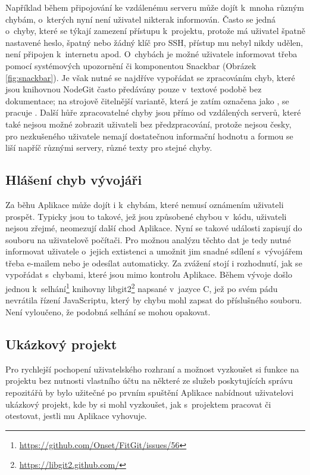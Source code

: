 Například během připojování ke vzdálenému serveru může dojít k~mnoha různým chybám, o~kterých nyní není uživatel nikterak informován. Často se jedná o~chyby, které se týkají zamezení přístupu k~projektu, protože má uživatel špatně nastavené heslo, špatný nebo žádný klíč pro SSH, přístup mu nebyl nikdy udělen, není připojen k~internetu apod. O~chybách je možné uživatele informovat třeba pomocí systémových upozornění či komponentou Snackbar (Obrázek \ref{fig:snackbar}). Je však nutné se najdříve vypořádat se zpracováním chyb, které jsou knihovnou NodeGit často předávány pouze v~textové podobě bez dokumentace; na strojově čitelnější variantě, která je zatím označena jako , se pracuje \cite{nodegit-error-codes}. Další hůře zpracovatelné chyby jsou přímo od vzdálených serverů, které také nejsou možné zobrazit uživateli bez předzpracování, protože nejsou česky, pro nezkušeného uživatele nemají dostatečnou informační hodnotu a formou se liší napříč různými servery, různé texty pro stejné chyby.

\subsection{Hlášení chyb vývojáři}

Za běhu Aplikace může dojít i k~chybám, které nemusí oznámením uživateli prospět. Typicky jsou to takové, jež jsou způsobené chybou v~kódu, uživateli nejsou zřejmé, neomezují další chod Aplikace. Nyní se takové události zapisují do souboru na uživatelově počítači. Pro možnou analýzu těchto dat je tedy nutné informovat uživatele o~jejich extistenci a umožnit jim snadné sdílení s~vývojářem třeba e-mailem nebo je odesílat automaticky. Za zvážení stojí i rozhodnutí, jak se vypořádat s~chybami, které jsou mimo kontrolu Aplikace. Během vývoje došlo jednou k~selhání\footnote{\url{https://github.com/Onset/FitGit/issues/56}} knihovny libgit2\footnote{\url{https://libgit2.github.com/}} napsané v~jazyce C, jež po svém pádu nevrátila řízení JavaScriptu, který by chybu mohl zapsat do příslušného souboru. Není vyloučeno, že podobná selhání se mohou opakovat.

\subsection{Ukázkový projekt}

Pro rychlejší pochopení uživatelského rozhraní a možnost vyzkoušet si funkce na projektu bez nutnosti vlastního účtu na některé ze služeb poskytujících správu repozitářů by bylo užitečné po prvním spuštění Aplikace nabídnout uživatelovi ukázkový projekt, kde by si mohl vyzkoušet, jak s~projektem pracovat či otestovat, jestli mu Aplikace vyhovuje.


